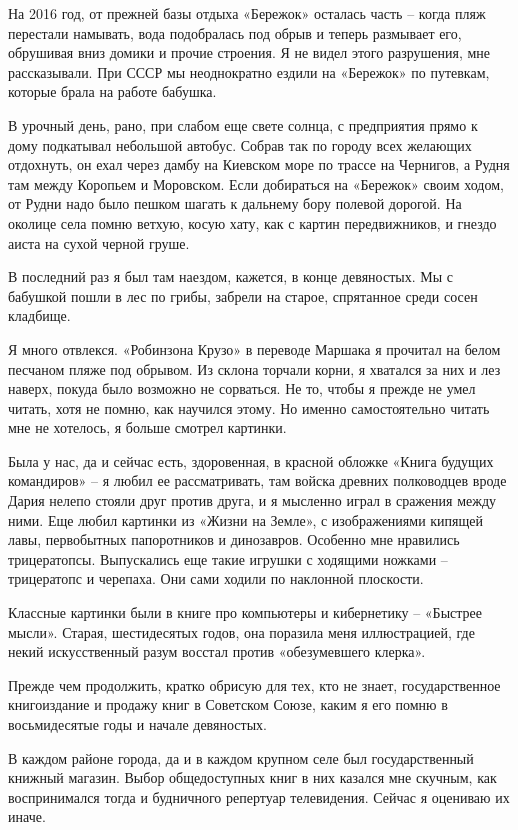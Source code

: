 На 2016 год, от прежней базы отдыха «Бережок» осталась часть – когда пляж перестали намывать, вода подобралась под обрыв и теперь размывает его, обрушивая вниз домики и прочие строения. Я не видел этого разрушения, мне рассказывали. При СССР мы неоднократно ездили на «Бережок» по путевкам, которые брала на работе бабушка. 

В урочный день, рано, при слабом еще свете солнца, с предприятия прямо к дому подкатывал небольшой автобус. Собрав так по городу всех желающих отдохнуть, он ехал через дамбу на Киевском море по трассе на Чернигов, а Рудня там между Коропьем и Моровском. Если добираться на «Бережок» своим ходом, от Рудни надо было пешком шагать к дальнему бору полевой дорогой. На околице села помню ветхую, косую хату, как с картин передвижников, и гнездо аиста на сухой черной груше.

В последний раз я был там наездом, кажется, в конце девяностых. Мы с бабушкой пошли в лес по грибы, забрели на старое, спрятанное среди сосен кладбище.

Я много отвлекся. «Робинзона Крузо» в переводе Маршака я прочитал на белом песчаном пляже под обрывом. Из склона торчали корни, я хватался за них и лез наверх, покуда было возможно не сорваться. Не то, чтобы я прежде не умел читать, хотя не помню, как научился этому. Но именно самостоятельно читать мне не хотелось, я больше смотрел картинки.

Была у нас, да и сейчас есть, здоровенная, в красной обложке «Книга будущих командиров» – я любил ее рассматривать, там войска древних полководцев вроде Дария нелепо стояли друг против друга, и я мысленно играл в сражения между ними. Еще любил картинки из «Жизни на Земле», с изображениями кипящей лавы, первобытных папоротников и динозавров. Особенно мне нравились трицератопсы. Выпускались еще такие игрушки с ходящими ножками – трицератопс и черепаха. Они сами ходили по наклонной плоскости.

Классные картинки были в книге про компьютеры и кибернетику – «Быстрее мысли». Старая, шестидесятых годов, она поразила меня иллюстрацией, где некий искусственный разум восстал против «обезумевшего клерка».

Прежде чем продолжить, кратко обрисую для тех, кто не знает, государственное книгоиздание и продажу книг в Советском Союзе, каким я его помню в восьмидесятые годы и начале девяностых.

В каждом районе города, да и в каждом крупном селе был государственный книжный магазин. Выбор общедоступных книг в них казался мне скучным, как воспринимался тогда и будничного репертуар телевидения. Сейчас я оцениваю их иначе.

